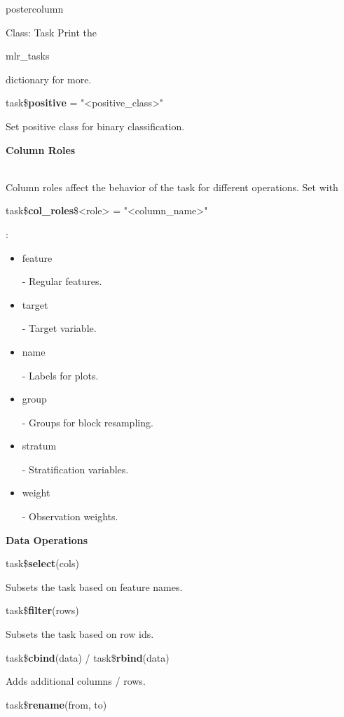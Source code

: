 \documentclass{beamer}
\newcommand{\codeinline}[1]{\begin{codeboxinline}#1\end{codeboxinline}}
\newcommand{\sectionheading}[1]{{\color{mlrblue}\large\raggedright\textbf{#1}}\vspace{1em}}
\begin{document}
\begin{frame}[fragile]{}
\begin{columns}
\begin{column}{.245\textwidth}
\begin{beamercolorbox}[center]{postercolumn}
\begin{minipage}{.98\textwidth}
{\begin{myblock}{Class: Task}
							\vspace{1em}
							Print the \codeinline{mlr\_tasks} dictionary for more.
							\vspace{0.5em}
							\begin{codebox}
								task\$\textbf{positive} = "<positive\_class>"
							\end{codebox}
							Set positive class for binary classification.
							\vspace{1em}
							\\
							\sectionheading{Column Roles}
							\\
							Column roles affect the behavior of the task for different operations.
							Set with
							\\
							\codeinline{task\$\textbf{col\_roles}\$<role> = "<column\_name>"}:
							\\
							\begin{itemize}
								\item \codeinline{feature} - Regular features.
								\item \codeinline{target} - Target variable.
								\item \codeinline{name} - Labels for plots.
								\item \codeinline{group} -  Groups for block resampling.
								\item \codeinline{stratum} - Stratification variables.
								\item \codeinline{weight} - Observation weights.
							\end{itemize}
							\vspace{1em}
							\sectionheading{Data Operations}
							\begin{codebox}
								task\$\textbf{select}(cols)
							\end{codebox}
							Subsets the task based on feature names.
							\\
							\begin{codebox}
								task\$\textbf{filter}(rows)
							\end{codebox}
							Subsets the task based on row ids.
							\\
							\begin{codebox}
								task\$\textbf{cbind}(data) / task\$\textbf{rbind}(data) 
							\end{codebox}
							Adds additional columns / rows.
							\\
							\begin{codebox}
								task\$\textbf{rename}(from, to)
							\end{codebox}

\end{myblock}}
\end{minipage}
\end{beamercolorbox}
\end{column}
\end{columns}
\end{frame}
\end{document}
